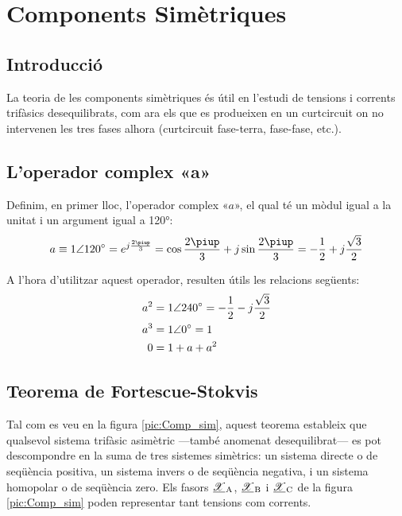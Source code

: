 
\chapter{Components Simètriques}  \label{sec:ch-comp-sim}

\section{Introducció}
La teoria de les components simètriques és útil en l'estudi de
tensions i corrents trifàsics
 desequilibrats, com ara els que es produeixen en un curtcircuit on no intervenen les tres
 fases alhora (curtcircuit fase-terra, fase-fase, etc.).

\section{L'operador complex «a»}

Definim, en primer lloc, l'operador complex «$a$», el qual té un mòdul
igual a la unitat i un argument igual a \ang{120}: \begin{equation}
   a \equiv \complexnum{1:120} = e^{j\frac{2\piup}{3}} =
   \cos \frac{2\piup}{3} + j \sin \frac{2\piup}{3} = - \frac{1}{2} + j \frac{\sqrt{3}}{2}
\end{equation}

A l'hora d'utilitzar aquest operador, resulten útils les relacions
següents:
\begin{subequations}
\begin{align}
    a^2 &= \complexnum{1:240}= - \frac{1}{2} - j \frac{\sqrt{3}}{2} \\
    a^3 &= \complexnum{1:0} = 1 \\
  	0 &=   1+ a + a^2 
 \end{align}
\end{subequations}

\section{\texorpdfstring{Teorema de Fortescue-Stokvis}{Teorema de Fortescue-Stokvis}}

Tal com es veu en la figura \vref{pic:Comp_sim}, aquest teorema
estableix que qualsevol sistema trifàsic asimètric ---també anomenat
desequilibrat---  es pot descompondre  en la suma de tres sistemes
simètrics: un sistema directe o de seqüència positiva, un sistema
invers o de seqüència negativa, i un sistema homopolar o de
seqüència zero. Els fasors $\cmplx{\mathscr{X}}\ped{A}$,
$\cmplx{\mathscr{X}}\ped{B}$ i $\cmplx{\mathscr{X}}\ped{C}$ de la figura \ref{pic:Comp_sim} poden representar tant
tensions com corrents.

